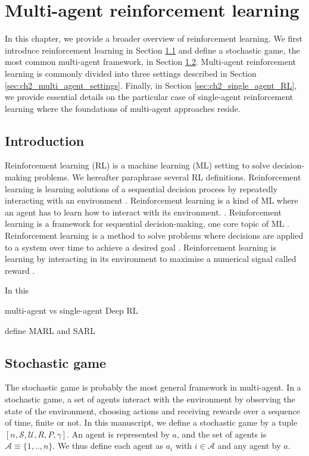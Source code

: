 \chapter{Multi-agent reinforcement learning} \label{ch:marl}

\begin{chapter_outline}

In this chapter, we provide a broader overview of reinforcement learning.
We first introduce reinforcement learning in Section \ref{sec:ch2_Introduction} and define a stochastic game, the most common multi-agent framework, in Section \ref{sec:ch2_stochastic_Game}.
Multi-agent reinforcement learning is commonly divided into three settings described in Section \ref{sec:ch2_multi_agent_settings}.
Finally, in Section \ref{sec:ch2_single_agent_RL}, we provide essential details on the particular case of single-agent reinforcement learning where the foundations of multi-agent approaches reside.

\end{chapter_outline}

\section{Introduction} 
\label{sec:ch2_Introduction}
Reinforcement learning (RL) is a machine learning (ML) setting to solve decision-making problems.
We hereafter paraphrase several RL definitions.
Reinforcement learning is learning solutions of a sequential decision process by repeatedly interacting with an environment \citep{marl-book}.
Reinforcement learning is a kind of ML where an agent has to learn how to interact with its environment. \citep{pml1Book}.
Reinforcement learning is a framework for sequential decision-making, one core topic of ML \citep{introDeepRL}.
Reinforcement learning is a method to solve problems where decisions are applied to a system over time to achieve a desired goal \citep{BusoniuErnstBook}.
Reinforcement learning is learning by interacting in its environment to maximise a numerical signal called reward \citep{sutton2018reinforcement}.

In this 

multi-agent vs single-agent
Deep RL

define MARL and SARL

\section{Stochastic game}
\label{sec:ch2_stochastic_Game}
The stochastic game \citep{stochasticGames} is probably the most general framework in multi-agent.
In a stochastic game, a set of agents interact with the environment by observing the state of the environment, choosing actions and receiving rewards over a sequence of time, finite or not.
In this manuscript, we define a stochastic game by a tuple $[n, \mathcal{S}, \mathcal{U}, R, P, \gamma]$.
An agent is represented by $a$, and the set of agents is $\mathcal{A} \equiv \{1,..,n\}$.
We thus define each agent as $a_i$ with $i \in \mathcal{A}$ and any agent by $a$.

